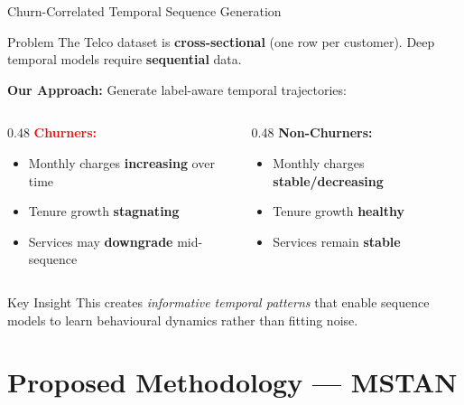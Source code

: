 \documentclass[aspectratio=169,11pt]{beamer}
\begin{document}
\begin{frame}{Churn-Correlated Temporal Sequence Generation}
\begin{block}{Problem}
The Telco dataset is \textbf{cross-sectional} (one row per customer). Deep temporal models require \textbf{sequential} data.
\end{block}
\vspace{4pt}
\textbf{Our Approach:} Generate label-aware temporal trajectories:
\vspace{4pt}
\begin{columns}[T]
\begin{column}{0.48\textwidth}
\textcolor{red}{\textbf{Churners:}}
\begin{itemize}
    \item Monthly charges \textbf{increasing} over time
    \item Tenure growth \textbf{stagnating}
    \item Services may \textbf{downgrade} mid-sequence
\end{itemize}
\end{column}
\begin{column}{0.48\textwidth}
\textcolor{MSTANgreen}{\textbf{Non-Churners:}}
\begin{itemize}
    \item Monthly charges \textbf{stable/decreasing}
    \item Tenure growth \textbf{healthy}
    \item Services remain \textbf{stable}
\end{itemize}
\end{column}
\end{columns}
\vspace{8pt}
\begin{exampleblock}{Key Insight}
This creates \emph{informative temporal patterns} that enable sequence models to learn behavioural dynamics rather than fitting noise.
\end{exampleblock}
\end{frame}

\section{Proposed Methodology — MSTAN}
\end{document}
